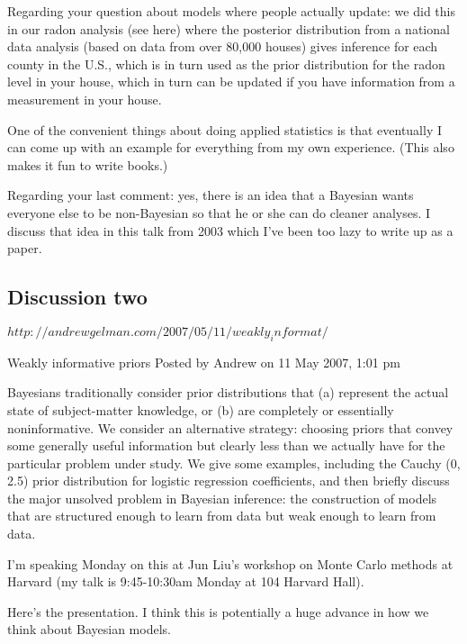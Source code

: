 Regarding your question about models where people actually update: we did this in our radon analysis (see here) where the posterior distribution from a national data analysis (based on data from over 80,000 houses) gives inference for each county in the U.S., which is in turn used as the prior distribution for the radon level in your house, which in turn can be updated if you have information from a measurement in your house.

One of the convenient things about doing applied statistics is that eventually I can come up with an example for everything from my own experience. (This also makes it fun to write books.)

Regarding your last comment: yes, there is an idea that a Bayesian wants everyone else to be non-Bayesian so that he or she can do cleaner analyses. I discuss that idea in this talk from 2003 which I’ve been too lazy to write up as a paper.

\subsection{Discussion two}
$http://andrewgelman.com/2007/05/11/weakly_informat/$

Weakly informative priors
Posted by Andrew on	11 May 2007, 1:01 pm

Bayesians traditionally consider prior distributions that (a) represent the actual state of subject-matter knowledge, or (b) are completely or essentially noninformative. We consider an alternative strategy: choosing priors that convey some generally useful information but clearly less than we actually have for the particular problem under study. We give some examples, including the Cauchy (0, 2.5) prior distribution for logistic regression coefficients, and then briefly discuss the major unsolved problem in Bayesian inference: the construction of models that are structured enough to learn from data but weak enough to learn from data.

I’m speaking Monday on this at Jun Liu’s workshop on Monte Carlo methods at Harvard (my talk is 9:45-10:30am Monday at 104 Harvard Hall).

Here’s the presentation. I think this is potentially a huge advance in how we think about Bayesian models.


